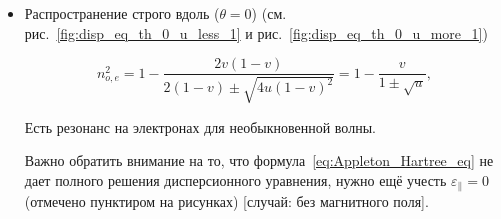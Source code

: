 \documentclass[10pt, a4paper]{article}
\begin{document}
\begin{itemize}
	\item Распространение строго вдоль ($\theta = 0$) (см. рис.~\ref{fig:disp_eq_th_0_u_less_1} и рис.~\ref{fig:disp_eq_th_0_u_more_1})
	
	\begin{equation*}
		n_{o,e}^2=1-\frac{2v(1-v)}{2(1-v) \pm \sqrt{4u(1-v)^2}} = 1-\frac{v}{1\pm\sqrt{u}}, 
	\end{equation*}

	Есть резонанс на электронах для необыкновенной волны.

	Важно обратить внимание на то, что формула~\eqref{eq:Appleton_Hartree_eq} не дает полного решения дисперсионного уравнения, нужно ещё учесть $\varepsilon_\parallel=0$ (отмечено пунктиром на рисунках) [случай: без магнитного поля].


\end{itemize}
\end{document}
